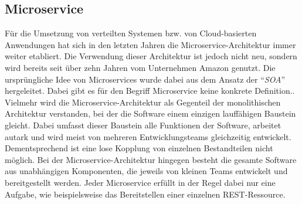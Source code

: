 \subsection{Microservice}
\label{sec:grundlagen:microservices}

Für die Umsetzung von verteilten Systemen bzw. von Cloud-basierten Anwendungen hat sich in den letzten Jahren die Microservice-Architektur immer weiter etabliert.\autocite[Vgl.][Kapitel \enquote{Monolithic architecture overview}]{MS-Sharma.2016}
Die Verwendung dieser Architektur ist jedoch nicht neu, sondern wird bereits seit über zehn Jahren vom Unternehmen Amazon genutzt.\autocite[Vgl.][]{MS-Wolff.02.11.2015} 
Die ursprüngliche Idee von Microservices wurde dabei aus dem Ansatz der \enquote{\textit{\ac{SOA}}} hergeleitet.\autocite[Vgl.][S. 1]{MS-Bucchiarone.2018} 
Dabei gibt es für den Begriff Microservice keine konkrete Definition.\autocite[Vgl.][S. 3]{MS-Wolff.2018}. 
Vielmehr wird die Microservice-Architektur als Gegenteil der monolithischen Architektur verstanden, bei der die Software einem einzigen lauffähigen Baustein gleicht.
Dabei umfasst dieser Baustein alle Funktionen der Software, arbeitet autark und wird meist von mehreren Entwicklungsteams gleichzeitig entwickelt.
Dementsprechend ist eine lose Kopplung von einzelnen Bestandteilen nicht möglich.
Bei der Microservice-Architektur hingegen besteht die gesamte Software aus unabhängigen Komponenten, die jeweils von kleinen Teams entwickelt und bereitgestellt werden.\autocite[Vgl.][]{MS-Fowler.25.03.2014} 
Jeder Microservice erfüllt in der Regel dabei nur eine Aufgabe, wie beispielsweise das Bereitstellen einer einzelnen \ac{REST}-Ressource.